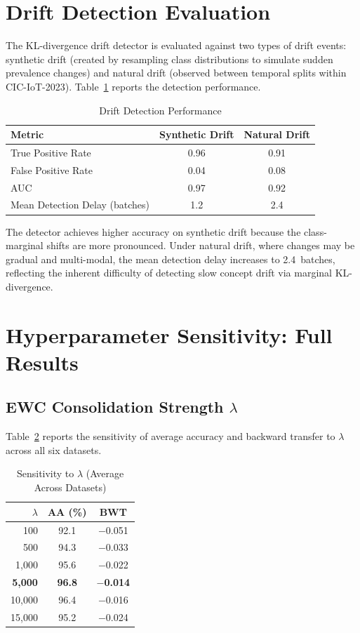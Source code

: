 \documentclass[journal]{IEEEtran}
\begin{document}
\section{Drift Detection Evaluation}

The KL-divergence drift detector is evaluated against two types of drift events: synthetic drift (created by resampling class distributions to simulate sudden prevalence changes) and natural drift (observed between temporal splits within CIC-IoT-2023). Table~\ref{tab:drift_eval} reports the detection performance.

\begin{table}[!t]
\centering
\caption{Drift Detection Performance}
\label{tab:drift_eval}
\begin{tabular}{@{}lcc@{}}
\toprule
\textbf{Metric} & \textbf{Synthetic Drift} & \textbf{Natural Drift} \\
\midrule
True Positive Rate & 0.96 & 0.91 \\
False Positive Rate & 0.04 & 0.08 \\
AUC & 0.97 & 0.92 \\
Mean Detection Delay (batches) & 1.2 & 2.4 \\
\bottomrule
\end{tabular}
\end{table}

The detector achieves higher accuracy on synthetic drift because the class-marginal shifts are more pronounced. Under natural drift, where changes may be gradual and multi-modal, the mean detection delay increases to 2.4~batches, reflecting the inherent difficulty of detecting slow concept drift via marginal KL-divergence.

\section{Hyperparameter Sensitivity: Full Results}

\subsection{EWC Consolidation Strength $\lambda$}

Table~\ref{tab:lambda_sensitivity} reports the sensitivity of average accuracy and backward transfer to $\lambda$ across all six datasets.

\begin{table}[!t]
\centering
\caption{Sensitivity to $\lambda$ (Average Across Datasets)}
\label{tab:lambda_sensitivity}
\begin{tabular}{@{}rcc@{}}
\toprule
$\lambda$ & \textbf{AA (\%)} & \textbf{BWT} \\
\midrule
100 & 92.1 & $-$0.051 \\
500 & 94.3 & $-$0.033 \\
1{,}000 & 95.6 & $-$0.022 \\
\textbf{5{,}000} & \textbf{96.8} & \textbf{$-$0.014} \\
10{,}000 & 96.4 & $-$0.016 \\
15{,}000 & 95.2 & $-$0.024 \\
\bottomrule
\end{tabular}
\end{table}
\end{document}
